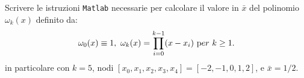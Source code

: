 Scrivere le istruzioni {\tt Matlab} necessarie per calcolare il valore in $\bar x$ del polinomio $\omega_k(x)$ definito da:
\[ \omega_0(x) \equiv 1, \  \omega_k(x) = \prod_{i=0}^{k-1}(x-x_i) \ {\mbox per } \ k \geq 1. \]
in particolare con $k = 5$, nodi ${[x_0, x_1,x_2, x_3, x_4]}={[-2, -1, 0, 1, 2]}$,  e $\bar x = 1/2$.
